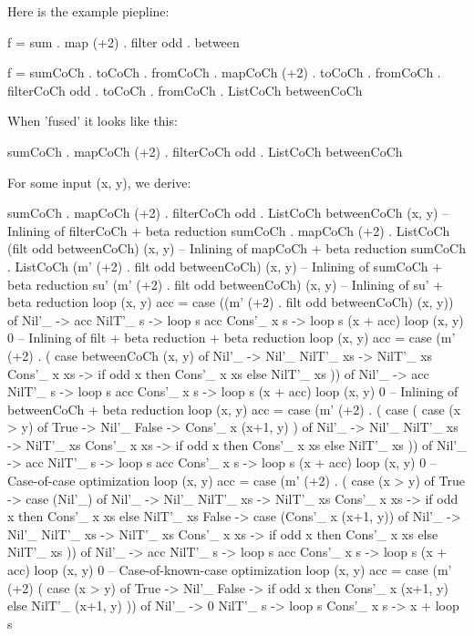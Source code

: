 Here is the example piepline:
\begin{spec}
f = sum . map (+2) . filter odd . between

f =	     sumCoCh          . toCoCh .
fromCoCh . mapCoCh (+2)   . toCoCh .
fromCoCh . filterCoCh odd . toCoCh .
fromCoCh . ListCoCh betweenCoCh
\end{spec}
When 'fused' it looks like this:
\begin{spec}
sumCoCh . mapCoCh (+2) . filterCoCh odd . ListCoCh betweenCoCh
\end{spec}
For some input (x, y), we derive:
\begin{spec}
sumCoCh . mapCoCh (+2) . filterCoCh odd . ListCoCh betweenCoCh (x, y)
-- Inlining of filterCoCh + beta reduction
sumCoCh . mapCoCh (+2) . ListCoCh (filt odd betweenCoCh) (x, y)
-- Inlining of mapCoCh + beta reduction
sumCoCh . ListCoCh (m' (+2) . filt odd betweenCoCh) (x, y)
-- Inlining of sumCoCh + beta reduction
su' (m' (+2) . filt odd betweenCoCh) (x, y)
-- Inlining of su' + beta reduction
loop (x, y) acc = case ((m' (+2) . filt odd betweenCoCh) (x, y)) of
  Nil'_ -> acc
  NilT'_ s -> loop s acc
  Cons'_ x s -> loop s (x + acc)
loop (x, y) 0
-- Inlining of filt + beta reduction + beta reduction
loop (x, y) acc = case (m' (+2) . (
  case betweenCoCh (x, y) of 
      Nil'_ -> Nil'_
      NilT'_ xs -> NilT'_ xs
      Cons'_ x xs -> if odd x then Cons'_ x xs else NilT'_ xs
)) of
  Nil'_ -> acc
  NilT'_ s -> loop s acc
  Cons'_ x s -> loop s (x + acc)
loop (x, y) 0
-- Inlining of betweenCoCh + beta reduction
loop (x, y) acc = case (m' (+2) . (
  case (
    case (x > y) of
      True -> Nil'_
      False -> Cons'_ x (x+1, y)
    ) of 
    Nil'_ -> Nil'_
    NilT'_ xs -> NilT'_ xs
    Cons'_ x xs -> if odd x then Cons'_ x xs else NilT'_ xs
)) of
  Nil'_ -> acc
  NilT'_ s -> loop s acc
  Cons'_ x s -> loop s (x + acc)
loop (x, y) 0
-- Case-of-case optimization
loop (x, y) acc = case (m' (+2) . (
  case (x > y) of
    True -> case (Nil'_) of
      Nil'_ -> Nil'_
      NilT'_ xs -> NilT'_ xs
      Cons'_ x xs -> if odd x then Cons'_ x xs else NilT'_ xs
    False -> case (Cons'_ x (x+1, y)) of
      Nil'_ -> Nil'_
      NilT'_ xs -> NilT'_ xs
      Cons'_ x xs -> if odd x then Cons'_ x xs else NilT'_ xs
)) of
  Nil'_ -> acc
  NilT'_ s -> loop s acc
  Cons'_ x s -> loop s (x + acc)
loop (x, y) 0
-- Case-of-known-case optimization
loop (x, y) acc = case (m' (+2) (
  case (x > y) of
    True -> Nil'_
    False -> if odd x then Cons'_ x (x+1, y) else NilT'_ (x+1, y)
)) of
  Nil'_ -> 0
  NilT'_ s -> loop s
  Cons'_ x s -> x + loop s

\end{spec}

